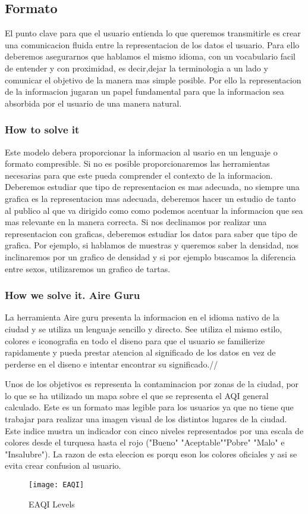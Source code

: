 \subsection{Formato}
El punto clave para que el usuario entienda lo que queremos transmitirle es crear una comunicacion fluida entre la representacion
de los datos el usuario. Para ello  deberemos asegurarnos que hablamos el mismo idioma, con un vocabulario facil de entender y
con proximidad, es decir,dejar la terminologia a un lado y comunicar el objetivo de la manera mas simple posible.
Por ello la representacion de la informacion jugaran un papel fundamental para que la 
informacion sea absorbida por el usuario de una manera natural.


\subsubsection{How to solve it} 
Este modelo debera proporcionar la informacion al usario en un lenguaje o formato compresible. Si no es posible proporcionaremos las 
herramientas necesarias para que este pueda comprender el contexto de la informacion.
Deberemos estudiar que tipo de representacion es mas adecuada, no siempre una grafica es la representacion mas adecuada, deberemos hacer un 
estudio de tanto al publico al que va dirigido como como podemos acentuar la informacion que sea mas relevante en la manera 
correcta.
Si nos declinamos por realizar una representacion con graficas, deberemos estudiar los datos para saber que tipo de grafica. Por ejemplo, 
si hablamos de muestras y queremos saber la densidad, nos inclinaremos por un grafico de densidad y si por ejemplo buscamos la diferencia 
entre sexos, utilizaremos un grafico de tartas.

\subsubsection{How we solve it. Aire Guru} 
La herramienta Aire guru presenta la informacion en el idioma nativo de la ciudad y se utiliza un lenguaje sencillo y directo.
See utiliza el mismo estilo, colores e iconografia en todo el diseno para que el usuario se familierize rapidamente y pueda
prestar atencion al significado de los datos en vez de perderse en el diseno e intentar encontrar su significado.//

Unos de los objetivos es representa la contaminacion por zonas de la ciudad, por lo que se ha utilizado un mapa sobre el que se representa
 el AQI general calculado. Este es un formato mas legible para los usuarios ya que no tiene que trabajar para realizar una imagen visual
 de los distintos lugares de la ciudad. Este indice mustra un indicador con cinco niveles representados por una escala de colores desde el 
 turquesa hasta el rojo ("Bueno" "Aceptable""Pobre" "Malo" e "Insalubre"). La razon de esta eleccion es porqu eson los colores oficiales y 
 asi se evita crear confusion al usuario.
 \newpage
 \begin{figure}[ht]
    \centering
    \texttt{[image: EAQI]}
    \caption{EAQI Levels}
\end{figure}

